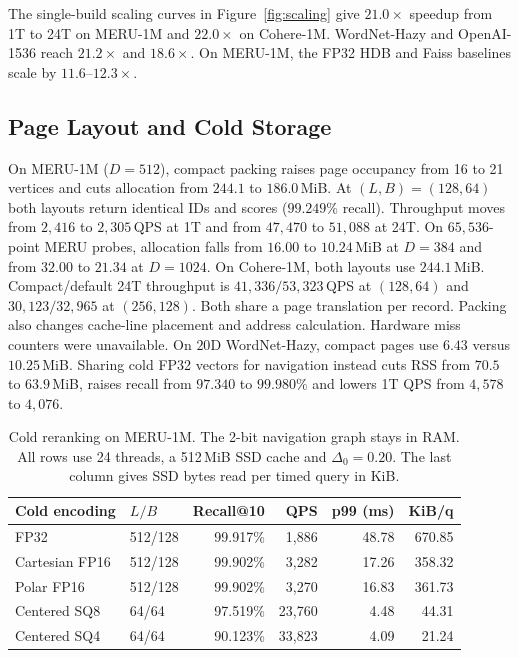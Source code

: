 The single-build scaling curves in Figure~\ref{fig:scaling} give $21.0\times$ speedup from 1T to 24T on {MERU-1M} and $22.0\times$ on {Cohere-1M}. {WordNet-Hazy} and {OpenAI-1536} reach $21.2\times$ and $18.6\times$. On {MERU-1M}, the FP32 {HDB} and {Faiss} baselines scale by $11.6$--$12.3\times$.

\subsection{Page Layout and Cold Storage}
\label{subsec:eval_storage}

On {MERU-1M} ($D=512$), compact packing raises page occupancy from 16 to 21 vertices and cuts allocation from $244.1$ to $186.0$\,MiB. At $(L,B)=(128,64)$ both layouts return identical IDs and scores ($99.249\%$ recall). Throughput moves from $2{,}416$ to $2{,}305$\,QPS at 1T and from $47{,}470$ to $51{,}088$ at 24T. On $65{,}536$-point MERU probes, allocation falls from $16.00$ to $10.24$\,MiB at $D=384$ and from $32.00$ to $21.34$ at $D=1024$. On {Cohere-1M}, both layouts use $244.1$\,MiB. Compact/default 24T throughput is $41{,}336/53{,}323$\,QPS at $(128,64)$ and $30{,}123/32{,}965$ at $(256,128)$. Both share a page translation per record. Packing also changes cache-line placement and address calculation. Hardware miss counters were unavailable. On $20$D {WordNet-Hazy}, compact pages use $6.43$ versus $10.25$\,MiB. Sharing cold FP32 vectors for navigation instead cuts RSS from $70.5$ to $63.9$\,MiB, raises recall from $97.340$ to $99.980\%$ and lowers 1T QPS from $4{,}578$ to $4{,}076$.

\begin{table}[t]
  \centering
  \caption{Cold reranking on {MERU-1M}. The 2-bit navigation graph stays in RAM. All rows use 24 threads, a 512\,MiB SSD cache and $\Delta_0=0.20$. The last column gives SSD bytes read per timed query in KiB.}
  \label{tab:meru_ssd}
  \footnotesize
  \setlength{\tabcolsep}{3pt}
  \begin{tabular}{@{}llrrrr@{}}
    \toprule
    Cold encoding & $L/B$ & Recall@10 & QPS & p99 (ms) & KiB/q \\
    \midrule
    FP32            & 512/128 & 99.917\% & 1,886 & 48.78 & 670.85 \\
    Cartesian FP16  & 512/128 & 99.902\% & 3,282 & 17.26 & 358.32 \\
    Polar FP16      & 512/128 & 99.902\% & 3,270 & 16.83 & 361.73 \\
    \midrule
    Centered SQ8    & 64/64 & 97.519\% & 23,760 & 4.48 & 44.31 \\
    Centered SQ4    & 64/64 & 90.123\% & 33,823 & 4.09 & 21.24 \\
    \bottomrule
  \end{tabular}
\end{table}

